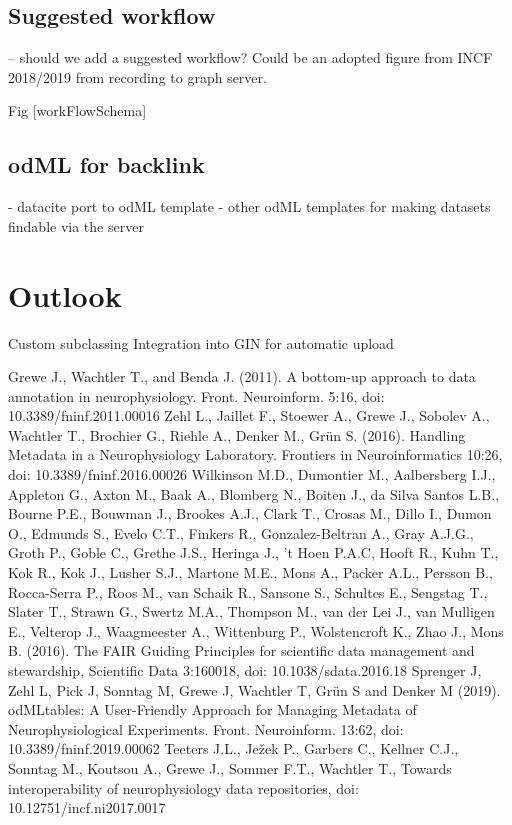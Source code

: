 \documentclass{article}
\begin{document}
\subsection{Suggested workflow}

-- should we add a suggested workflow? Could be an adopted figure from INCF 2018/2019 from recording to graph server.

Fig [workFlowSchema]

\subsection{odML for backlink}
- datacite port to odML template
- other odML templates for making datasets findable via the server

\section{Outlook}
Custom subclassing
Integration into GIN for automatic upload

\begin{thebibliography}{}
Grewe J., Wachtler T., and Benda J. (2011). A bottom-up approach to data annotation in neurophysiology. Front. Neuroinform. 5:16, doi: 10.3389/fninf.2011.00016
Zehl L., Jaillet F., Stoewer A., Grewe J., Sobolev A., Wachtler T., Brochier G., Riehle A., Denker M., Grün S. (2016). Handling Metadata in a Neurophysiology Laboratory. Frontiers in Neuroinformatics 10:26, doi: 10.3389/fninf.2016.00026
Wilkinson M.D., Dumontier M., Aalbersberg I.J., Appleton G., Axton M., Baak A., Blomberg N., Boiten J., da Silva Santos L.B., Bourne P.E., Bouwman J., Brookes A.J., Clark T., Crosas M., Dillo I., Dumon O., Edmunds S., Evelo C.T., Finkers R., Gonzalez-Beltran A., Gray A.J.G., Groth P., Goble C., Grethe J.S., Heringa J., ’t Hoen P.A.C, Hooft R., Kuhn T., Kok R., Kok J., Lusher S.J., Martone M.E., Mons A., Packer A.L., Persson B., Rocca-Serra P., Roos M., van Schaik R., Sansone S., Schultes E., Sengstag T., Slater T., Strawn G., Swertz M.A., Thompson M., van der Lei J., van Mulligen E., Velterop J., Waagmeester A., Wittenburg P., Wolstencroft K., Zhao J., Mons B. (2016). The FAIR Guiding Principles for scientific data management and stewardship, Scientific Data 3:160018, doi: 10.1038/sdata.2016.18
Sprenger J, Zehl L, Pick J, Sonntag M, Grewe J, Wachtler T, Grün S and Denker M (2019). odMLtables: A User-Friendly Approach for Managing Metadata of Neurophysiological Experiments. Front. Neuroinform. 13:62, doi: 10.3389/fninf.2019.00062
Teeters J.L., Ježek P., Garbers C., Kellner C.J., Sonntag M., Koutsou A., Grewe J., Sommer F.T., Wachtler T., Towards interoperability of neurophysiology data repositories, doi: 10.12751/incf.ni2017.0017
\end{thebibliography}
\end{document}
